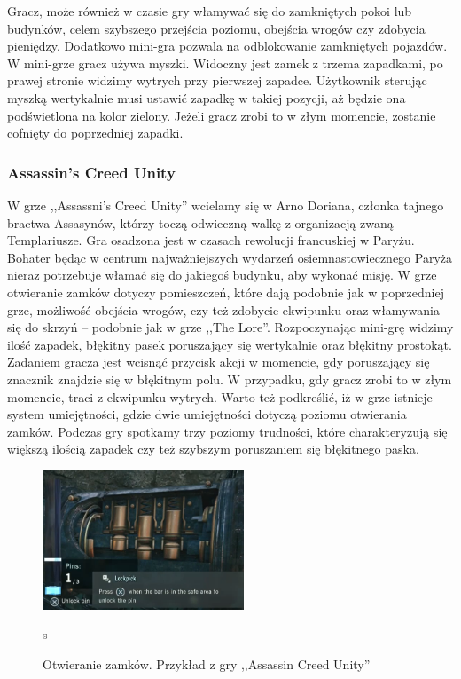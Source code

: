\documentclass[oneside,polski,logo]{amuthesis}
\begin{document}
Gracz, może również w czasie gry włamywać się do zamkniętych pokoi lub budynków, celem szybszego przejścia poziomu, obejścia wrogów czy zdobycia pieniędzy. Dodatkowo mini-gra pozwala na odblokowanie zamkniętych pojazdów. W mini-grze gracz używa myszki. Widoczny jest zamek z trzema zapadkami, po prawej stronie widzimy wytrych przy pierwszej zapadce. Użytkownik sterując myszką wertykalnie musi ustawić zapadkę w takiej pozycji, aż będzie ona podświetlona na kolor zielony. Jeżeli gracz zrobi to w złym momencie, zostanie cofnięty do poprzedniej zapadki. \cite{Mafia2}

\subsubsection{Assassin's Creed Unity}
\par W grze ,,Assassni's Creed Unity'' wcielamy się w Arno Doriana, członka tajnego bractwa Assasynów, którzy toczą odwieczną walkę z organizacją zwaną Templariusze. Gra osadzona jest w czasach rewolucji francuskiej w Paryżu. Bohater będąc w centrum najważniejszych wydarzeń osiemnastowiecznego Paryża nieraz potrzebuje włamać się do jakiegoś budynku, aby wykonać misję. W grze otwieranie zamków dotyczy pomieszczeń, które dają podobnie jak w poprzedniej grze, możliwość obejścia wrogów, czy też zdobycie ekwipunku oraz włamywania się do skrzyń – podobnie jak w grze ,,The Lore''. Rozpoczynając mini-grę widzimy ilość zapadek, błękitny pasek poruszający się wertykalnie oraz błękitny prostokąt. Zadaniem gracza jest wcisnąć przycisk akcji w momencie, gdy poruszający się znacznik znajdzie się w błękitnym polu. W przypadku, gdy gracz zrobi to w złym momencie, traci z ekwipunku wytrych. Warto też podkreślić, iż w grze istnieje system umiejętności, gdzie dwie umiejętności dotyczą poziomu otwierania zamków. Podczas gry spotkamy trzy poziomy trudności, które charakteryzują się większą ilością zapadek czy też szybszym poruszaniem się błękitnego paska. \cite{acu}
\begin{figure}[h]
	\centering
	\includegraphics[width=6cm]{images/tyrek/acu.png}
	\caption{Otwieranie zamków. Przykład z gry ,,Assassin Creed Unity''}s
\end{figure}
\end{document}
